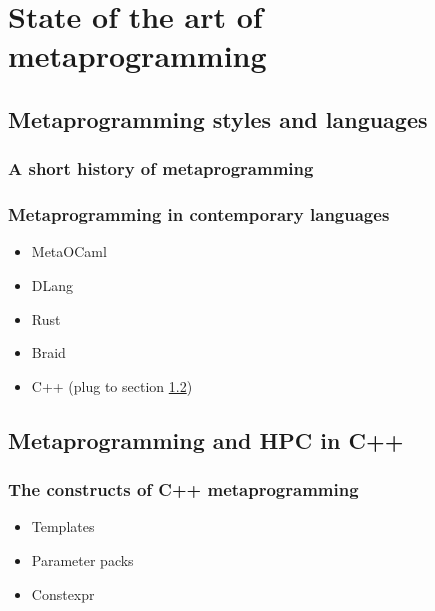 \documentclass[../../main.tex]{subfiles}
\begin{document}

\chapter{State of the art of metaprogramming}

\section{Metaprogramming styles and languages}

\subsection{A short history of metaprogramming}

\subsection{Metaprogramming in contemporary languages}

\begin{itemize}
\item MetaOCaml

\item DLang

\item Rust

\item Braid

\item C++ (plug to section \ref{lbl:meta-cpp})
\end{itemize}

\section{Metaprogramming and HPC in C++} \label{lbl:meta-cpp}

\subsection{The constructs of C++ metaprogramming}

\begin{itemize}
\item Templates

\item Parameter packs

\item Constexpr
\end{itemize}
\end{document}
